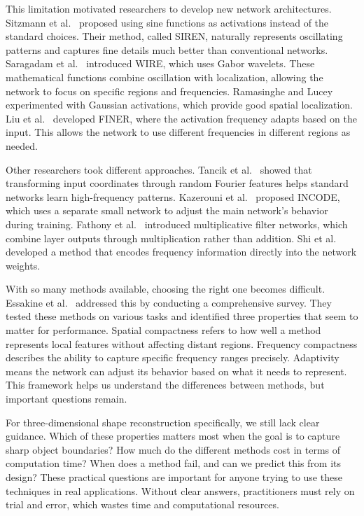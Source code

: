 This limitation motivated researchers to develop new network architectures. Sitzmann et al.~\cite{sitzmann2020siren} proposed using sine functions as activations instead of the standard choices. Their method, called SIREN, naturally represents oscillating patterns and captures fine details much better than conventional networks. Saragadam et al.~\cite{saragadam2023wire} introduced WIRE, which uses Gabor wavelets. These mathematical functions combine oscillation with localization, allowing the network to focus on specific regions and frequencies. Ramasinghe and Lucey~\cite{ramasinghe2022gauss} experimented with Gaussian activations, which provide good spatial localization. Liu et al.~\cite{liu2024finer} developed FINER, where the activation frequency adapts based on the input. This allows the network to use different frequencies in different regions as needed.

Other researchers took different approaches. Tancik et al.~\cite{tancik2020fourier} showed that transforming input coordinates through random Fourier features helps standard networks learn high-frequency patterns. Kazerouni et al.~\cite{kazerouni2024incode} proposed INCODE, which uses a separate small network to adjust the main network's behavior during training. Fathony et al.~\cite{fathony2021mfn} introduced multiplicative filter networks, which combine layer outputs through multiplication rather than addition. Shi et al.~\cite{shi2024fr} developed a method that encodes frequency information directly into the network weights.

With so many methods available, choosing the right one becomes difficult. Essakine et al.~\cite{essakine2024inr} addressed this by conducting a comprehensive survey. They tested these methods on various tasks and identified three properties that seem to matter for performance. Spatial compactness refers to how well a method represents local features without affecting distant regions. Frequency compactness describes the ability to capture specific frequency ranges precisely. Adaptivity means the network can adjust its behavior based on what it needs to represent. This framework helps us understand the differences between methods, but important questions remain.

For three-dimensional shape reconstruction specifically, we still lack clear guidance. Which of these properties matters most when the goal is to capture sharp object boundaries? How much do the different methods cost in terms of computation time? When does a method fail, and can we predict this from its design? These practical questions are important for anyone trying to use these techniques in real applications. Without clear answers, practitioners must rely on trial and error, which wastes time and computational resources.

